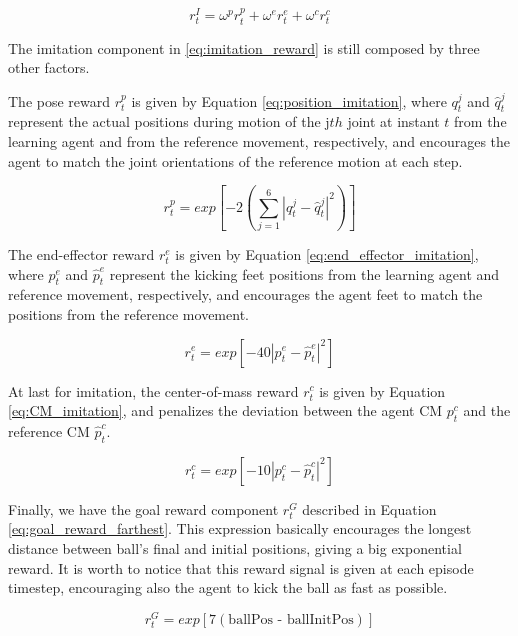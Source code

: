 \begin{equation}
r^I_t = \omega^p r^p_t + \omega^e r^e_t + \omega^c r^c_t
\label{eq:imitation_reward}
\end{equation}

The imitation component in \eqref{eq:imitation_reward} is still composed by three other factors.

The pose reward $r^p_t$ is given by Equation \eqref{eq:position_imitation}, where $q_t^j$ and $\hat{q}_t^j$ represent the actual positions during motion of the j$th$ joint at instant $t$ from the learning agent and from the reference movement, respectively, and encourages the agent to match the joint orientations of the reference motion at each step.

\begin{equation}
r^p_t = exp \left[ -2 \left( \sum_{j=1}^{6}{|q_t^j-\hat{q}_t^j|^2} \right) \right]
\label{eq:position_imitation}
\end{equation}

The end-effector reward $r_t^e$ is given by Equation \eqref{eq:end_effector_imitation}, where $p_t^e$ and $\hat{p}_t^e$ represent the kicking feet positions from the learning agent and reference movement, respectively, and encourages the agent feet to match the positions from the reference movement.

\begin{equation}
r^e_t = exp \left[ -40 |p_t^e-\hat{p}_t^e|^2 \right]
\label{eq:end_effector_imitation}
\end{equation}

At last for imitation, the center-of-mass reward $r_t^c$ is given by Equation \eqref{eq:CM_imitation}, and penalizes the deviation between the agent CM $p_t^c$ and the reference CM $\hat{p}_t^c$.

\begin{equation}
r^c_t = exp \left[ -10 |p_t^c-\hat{p}_t^c|^2 \right]
\label{eq:CM_imitation}
\end{equation}

Finally, we have the goal reward component $r_t^G$ described in Equation \eqref{eq:goal_reward_farthest}. This expression basically encourages the longest distance between ball's final and initial positions, giving a big exponential reward. It is worth to notice that this reward signal is given at each episode timestep, encouraging also the agent to kick the ball as fast as possible.

\begin{equation}
r_t^G = exp \left[ 7 (\text{ballPos - ballInitPos}) \right]
\label{eq:goal_reward_farthest}
\end{equation}

